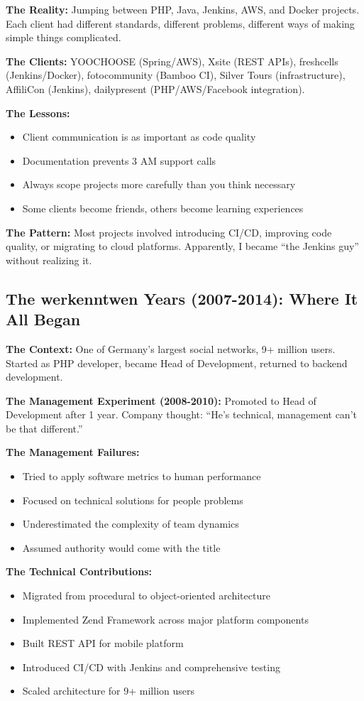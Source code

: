 \documentclass[11pt,a4paper]{article}
\begin{document}
\textbf{The Reality:} Jumping between PHP, Java, Jenkins, AWS, and Docker projects. Each client had different standards, different problems, different ways of making simple things complicated.

\textbf{The Clients:} YOOCHOOSE (Spring/AWS), Xsite (REST APIs), freshcells (Jenkins/Docker), fotocommunity (Bamboo CI), Silver Tours (infrastructure), AffiliCon (Jenkins), dailypresent (PHP/AWS/Facebook integration).

\textbf{The Lessons:}
\begin{itemize}
\item Client communication is as important as code quality
\item Documentation prevents 3 AM support calls
\item Always scope projects more carefully than you think necessary
\item Some clients become friends, others become learning experiences
\end{itemize}

\textbf{The Pattern:} Most projects involved introducing CI/CD, improving code quality, or migrating to cloud platforms. Apparently, I became ``the Jenkins guy'' without realizing it.

\subsection{The werkenntwen Years (2007-2014): Where It All Began}
\textbf{The Context:} One of Germany's largest social networks, 9+ million users. Started as PHP developer, became Head of Development, returned to backend development.

\textbf{The Management Experiment (2008-2010):} Promoted to Head of Development after 1 year. Company thought: ``He's technical, management can't be that different.''

\textbf{The Management Failures:}
\begin{itemize}
\item Tried to apply software metrics to human performance
\item Focused on technical solutions for people problems
\item Underestimated the complexity of team dynamics
\item Assumed authority would come with the title
\end{itemize}

\textbf{The Technical Contributions:}
\begin{itemize}
\item Migrated from procedural to object-oriented architecture
\item Implemented Zend Framework across major platform components
\item Built REST API for mobile platform
\item Introduced CI/CD with Jenkins and comprehensive testing
\item Scaled architecture for 9+ million users
\end{itemize}
\end{document}
